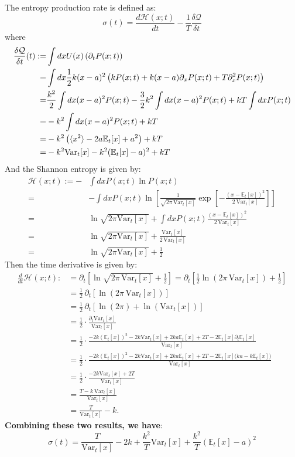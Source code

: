 \documentclass[11pt]{article}
\begin{document}
The entropy production rate is defined as:
	\[
	\sigma(t)=\frac{d\mathcal{H}(x;t)}{dt}-\frac{1}{T}\frac{\delta\mathcal{Q}}{\delta t}
	\]
	where
	\[
	\begin{aligned}
		\frac{\delta\mathcal{Q}}{\delta t}(t):=&\int dx U(x)\left(\partial_t P(x;t)\right)\\
		=&\int dx \frac{1}{2}k(x-a)^2\left(kP(x;t)+k(x-a)\partial_xP(x;t)+T\partial_x^2P(x;t)\right)\\
		=&\frac{k^2}{2}\int dx (x-a)^2 P(x;t)-\frac32 k^2\int dx (x-a)^2 P(x;t)+kT\int dx P(x;t)\\
		=&-k^2\int dx (x-a)^2P(x;t)+kT\\
		=&-k^2\left(\braket{x^2}-2a\mathbb{E}_t[x]+a^2\right)+kT\\
		=&-k^2\mathrm{Var}_t[x]-k^2(\mathbb{E}_t[x]-a)^2+kT
	\end{aligned}
	\]
	And the Shannon entropy is given by:
	\[
	\begin{aligned}
		\mathcal{H}(x;t):=-&\int dx P(x;t)\ln P(x;t)\\
		=&-\int dx P(x;t)\ln\left[\frac{1}{\sqrt{2\pi\,\mathrm{Var}_t[x]}}
		\exp\left[-\frac{(x-\mathbb{E}_t[x])^2}{2\,\mathrm{Var}_t[x]}\right]\right]\\
		=&\ln\sqrt{2\pi\mathrm{Var}_t[x]}+\int dx P(x;t)\frac{(x-\mathbb{E}_t[x])^2}{2\,\mathrm{Var}_t[x]}\\
		=&\ln\sqrt{2\pi\mathrm{Var}_t[x]}+\frac{\mathrm{Var}_t[x]}{2\,\mathrm{Var}_t[x]}\\
		=&\ln\sqrt{2\pi\mathrm{Var}_t[x]}+\frac{1}{2}
	\end{aligned}
	\]
	Then the time derivative is given by:
	\[
	\begin{aligned}
		\frac{d}{dt}\mathcal{H}(x;t):&=\partial_t\left[\ln\sqrt{2\pi\,\mathrm{Var}_t[x]}+\frac12\right]
		=\partial_t\left[\frac12\ln\left(2\pi\,\mathrm{Var}_t[x]\right)+\frac12\right]\\
		&=\frac12\,\partial_t\left[\ln\left(2\pi\,\mathrm{Var}_t[x]\right)\right]\\
		&=\frac12\,\partial_t\left[\ln(2\pi)+\ln\left(\mathrm{Var}_t[x]\right)\right]\\
		&=\frac12\cdot \frac{\partial_t\mathrm{Var}_t[x]}{\mathrm{Var}_t[x]}\\
		&=\frac12\cdot \frac{-2k(\mathbb{E}_t[x])^2-2k\mathrm{Var}_t[x]+2ka\mathbb{E}_t[x]+2T-2\mathbb{E}_t[x]\partial_t\mathbb{E}_t[x]}{\mathrm{Var}_t[x]}\\
		&=\frac12\cdot \frac{-2k(\mathbb{E}_t[x])^2-2k\mathrm{Var}_t[x]+2ka\mathbb{E}_t[x]+2T-2\mathbb{E}_t[x]\bigl(ka-k\mathbb{E}_t[x]\bigr)}{\mathrm{Var}_t[x]}\\
		&=\frac12\cdot \frac{-2k\mathrm{Var}_t[x]+2T}{\mathrm{Var}_t[x]}\\
		&=\frac{T-k\,\mathrm{Var}_t[x]}{\mathrm{Var}_t[x]}\\
		&=\frac{T}{\mathrm{Var}_t[x]}-k.
	\end{aligned}
	\]
	\textbf{Combining these two results, we have}:
	\[
	\boxed{
		\sigma(t)=\frac{T}{\mathrm{Var}_t[x]}-2k+\frac{k^2}{T}\mathrm{Var}_t[x]+\frac{k^2}{T}(\mathbb{E}_t[x]-a)^2
	}
	\]
\end{document}
